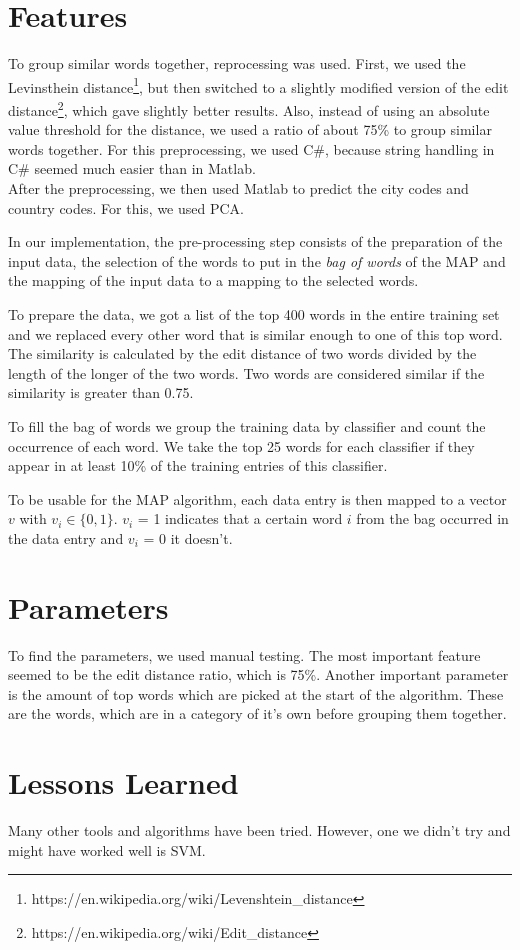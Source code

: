 \documentclass[a4paper, 11pt]{article}
\begin{document}
\section{Features}
To group similar words together, reprocessing was used. First, we used the Levinsthein distance\footnote{https://en.wikipedia.org/wiki/Levenshtein\_distance}, but then switched to a slightly modified version of the edit distance\footnote{https://en.wikipedia.org/wiki/Edit\_distance}, which gave slightly better results. Also, instead of using an absolute value threshold for the distance, we used a ratio of about 75\% to group similar words together. For this preprocessing, we used C\#, because string handling in C\# seemed much easier than in Matlab.\\

After the preprocessing, we then used Matlab to predict the city codes and country codes. For this, we used PCA.

In our implementation, the pre-processing step consists of the preparation of the input data, the selection of the words to put in the \textit{bag of words} of the MAP and the mapping of the input data to a mapping to the selected words. 

To prepare the data, we got a list of the top 400 words in the entire training set and we replaced every other word that is similar enough to one of this top word. The similarity is calculated by the edit distance of two words divided by the length of the longer of the two words. Two words are considered similar if the similarity is greater than 0.75.

To fill the bag of words we group the training data by classifier and count the occurrence of each word. We take the top 25 words for each classifier if they appear in at least 10\% of the training entries of this classifier.

To be usable for the MAP algorithm, each data entry is then mapped to a vector $v$ with $v_i \in \lbrace0, 1\rbrace$. $v_i$ = 1 indicates that a certain word $i$ from the bag occurred in the data entry and $v_i$ = 0 it doesn't.

\section{Parameters}
To find the parameters, we used manual testing. The most important feature seemed to be the edit distance ratio, which is 75\%. Another important parameter is the amount of top words which are picked at the start of the algorithm. These are the words, which are in a category of it's own before grouping them together.

\section{Lessons Learned}
Many other tools and algorithms have been tried. However, one we didn't try and might have worked well is SVM.
\end{document}
